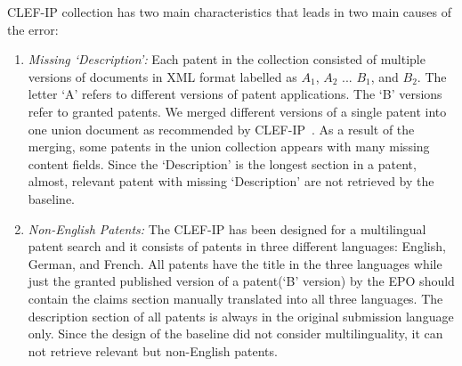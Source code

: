 CLEF-IP collection has two main characteristics that leads in two main causes of the error: 
\begin{enumerate}

\item \textit{Missing `Description': } Each patent in the collection consisted of multiple versions of documents in XML format labelled as $ A_{1} $, $ A_{2} $ ... $ B_{1} $, and $ B_{2} $. The letter `A' refers to different versions of patent applications. The `B' versions refer to granted patents. We merged different versions of a single patent into one union document as recommended by CLEF-IP~\citep{magdy2012toward}. As a result of the merging, some patents in the union collection appears with many missing content fields. Since the `Description' is the longest section in a patent, almost, relevant patent with missing `Description' are not retrieved by the baseline.

\item \textit{Non-English Patents: } The CLEF-IP has been designed for a multilingual patent search and it consists of patents in three different languages: English, German, and French. All patents have the title in the three languages while just the granted published version of a patent(`B' version) by the EPO should contain the claims section manually translated into all three languages. The description section of all patents is always in the original submission language only. Since the design of the baseline did not consider multilinguality, it can not retrieve relevant but non-English patents.   
\end{enumerate}
